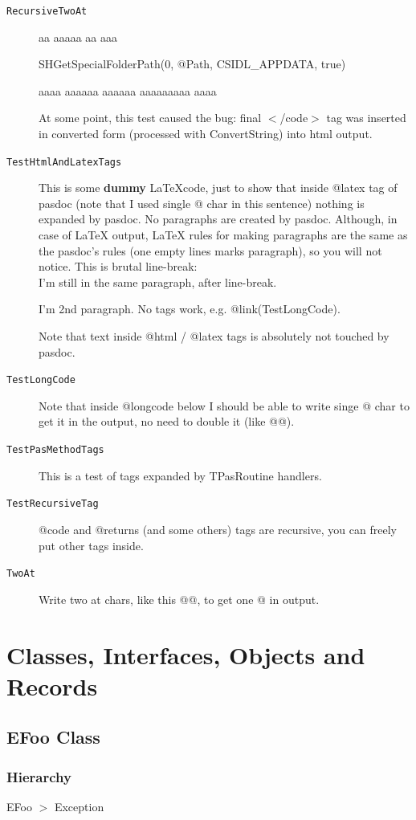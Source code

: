 \documentclass{report}
\begin{document}
\begin{description}
\item[\texttt{RecursiveTwoAt}]aa aaaaa aa aaa \begin{ttfamily}SHGetSpecialFolderPath(0, @Path, CSIDL{\_}APPDATA, true)\end{ttfamily} aaaa aaaaaa aaaaaa aaaaaaaaa aaaa

At some point, this test caused the bug: final {$<$}/code{$>$} tag was inserted in converted form (processed with ConvertString) into html output.
\item[\texttt{TestHtmlAndLatexTags}]


    This is some {\bf dummy} \LaTeX code, just to show that inside
    @latex tag of pasdoc (note that I used single @ char in this sentence)
    nothing is expanded by pasdoc.
    No paragraphs are created by pasdoc. Although, in case of LaTeX output,
    LaTeX rules for making paragraphs are the same as the pasdoc's rules
    (one empty lines marks paragraph), so you will not notice.
    This is brutal line-break: \\
    I'm still in the same paragraph, after line-break.

    I'm 2nd paragraph.
    No tags work, e.g. @link(TestLongCode).
  

Note that text inside @html / @latex tags is absolutely not touched by pasdoc.
\item[\texttt{TestLongCode}]Note that inside @longcode below I should be able to write singe @ char to get it in the output, no need to double it (like @@).
\item[\texttt{TestPasMethodTags}]This is a test of tags expanded by TPasRoutine handlers.
\item[\texttt{TestRecursiveTag}]@code and @returns (and some others) tags are recursive, you can freely put other tags inside.
\item[\texttt{TwoAt}]Write two at chars, like this @@, to get one @ in output.
\end{description}
\section{Classes, Interfaces, Objects and Records}
\subsection*{EFoo Class}
\subsubsection*{\large{\textbf{Hierarchy}}\normalsize\hspace{1ex}\hfill}
EFoo {$>$} Exception
\end{document}
